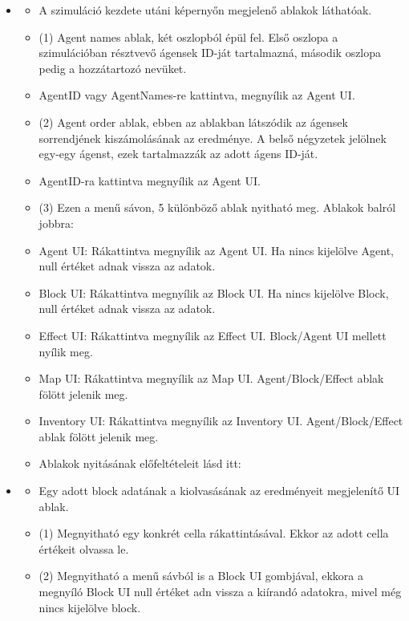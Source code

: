 \begin{itemize}
    \item {}
    
    \begin{itemize}
        \item A szimuláció kezdete utáni képernyőn megjelenő ablakok láthatóak.
        \item (1) Agent names ablak, két oszlopból épül fel. Első oszlopa a szimulációban résztvevő ágensek ID-ját tartalmazná, második oszlopa pedig a hozzátartozó nevüket.
        \item AgentID vagy AgentNames-re kattintva, megnyílik az Agent UI.
        \item (2) Agent order ablak, ebben az ablakban látszódik az ágensek sorrendjének kiszámolásának az eredménye. A belső négyzetek jelölnek egy-egy ágenst, ezek tartalmazzák az adott ágens ID-ját.
        \item AgentID-ra kattintva megnyílik az Agent UI.
        \item (3) Ezen a menű sávon, 5 különböző ablak nyitható meg. Ablakok balról jobbra:
        \item Agent UI: Rákattintva megnyílik az Agent UI. Ha nincs kijelölve Agent, null értéket adnak vissza az adatok.
        \item Block UI: Rákattintva megnyílik az Block UI. Ha nincs kijelölve Block, null értéket adnak vissza az adatok.
        \item Effect UI: Rákattintva megnyílik az Effect UI. Block/Agent UI mellett nyílik meg.
        \item Map UI: Rákattintva megnyílik az Map UI. Agent/Block/Effect ablak fölött jelenik meg.
        \item Inventory UI: Rákattintva megnyílik az Inventory UI. Agent/Block/Effect ablak fölött jelenik meg.
        \item Ablakok nyitásának előfeltételeit lásd itt: 
    \end{itemize}

    \item {}
    
    \begin{itemize}
        \item Egy adott block adatának a kiolvasásának az eredményeit megjelenítő UI ablak.
        \item (1) Megnyitható egy konkrét cella rákattintásával. Ekkor az adott cella értékeit olvassa le.
        \item (2) Megnyitható a menű sávból is a Block UI gombjával, ekkora a megnyíló Block UI null értéket adn vissza a kiírandó adatokra, mivel még nincs kijelölve block.
    \end{itemize}


\end{itemize}
